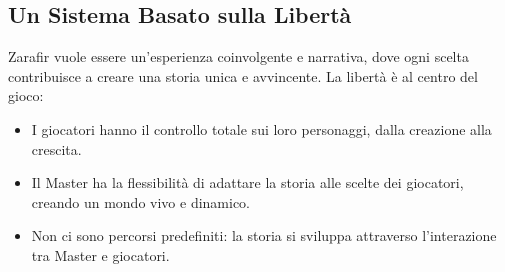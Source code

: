 \documentclass[../manuale_main.tex]{subfiles}
\begin{document}
\subsection{Un Sistema Basato sulla Libertà}
Zarafir vuole essere un’esperienza coinvolgente e narrativa, dove ogni scelta contribuisce a creare una storia unica e avvincente. La libertà è al centro del gioco:

\begin{itemize}
    \item I giocatori hanno il controllo totale sui loro personaggi, dalla creazione alla crescita.
    \item Il Master ha la flessibilità di adattare la storia alle scelte dei giocatori, creando un mondo vivo e dinamico.
    \item Non ci sono percorsi predefiniti: la storia si sviluppa attraverso l'interazione tra Master e giocatori.
\end{itemize}
\end{document}
